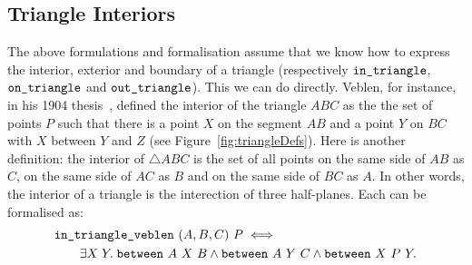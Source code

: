 
\subsection{Triangle Interiors}\label{sec:TriangleInteriorDefinition}

The above formulations and formalisation assume that we know how to express the interior, exterior and boundary of a triangle (respectively $\texttt{in\_triangle}$, $\texttt{on\_triangle}$ and $\texttt{out\_triangle}$). This we can do directly. Veblen, for instance, in his 1904 thesis~\cite{Veblenphd}, defined the interior of the triangle $ABC$ as the the set of points $P$ such that there is a point $X$ on the segment $AB$ and a point $Y$ on $BC$ with $X$ between $Y$ and $Z$ (see Figure~\ref{fig:triangleDefs}). Here is another definition: the interior of $\triangle ABC$ is the set of all points on the same side of $AB$ as $C$, on the same side of $AC$ as $B$ and on the same side of $BC$ as $A$. In other words, the interior of a triangle is the interection of three half-planes. Each can be formalised as:
\begin{equation*}
\begin{split}
  &\texttt{in\_triangle\_veblen}\ (A,B,C)\ P \iff\\
  &\qquad\exists X\; Y.\; \texttt{between}\ A\ X\ B \wedge \texttt{between}\ A\ Y\ C \wedge \texttt{between}\ X\ P\ Y.
\end{split}
\end{equation*}

